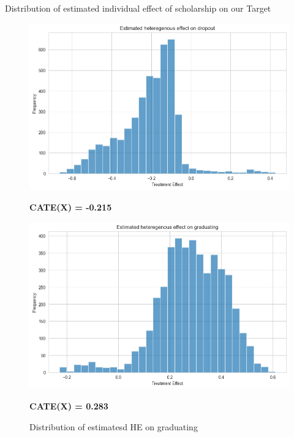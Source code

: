\documentclass[aspectratio=169]{beamer}
\begin{document}
\begin{frame}{Distribution of estimated individual effect of scholarship on our Target}

\begin{figure}[h!]
    \begin{minipage}[b]{0.45\textwidth}
        
        \caption{Distribution of estimatesd HE on droupout}
        \includegraphics[width=1\linewidth]{Tex_Pictures/Distribution_of_TE_drop_out.png}

       \textbf{ CATE(X) = -0.215}
       
    \end{minipage}
    \hspace{0.05\textwidth}
    \begin{minipage}[b]{0.45\textwidth}
        \caption{Distribution of estimatesd HE on graduating}
        \includegraphics[width=1\linewidth]{Tex_Pictures/Distribution_TE_graduate.png}

         \textbf{ CATE(X) = 0.283}
       
    \end{minipage}
    
 \end{figure}   
\end{frame}
\end{document}
